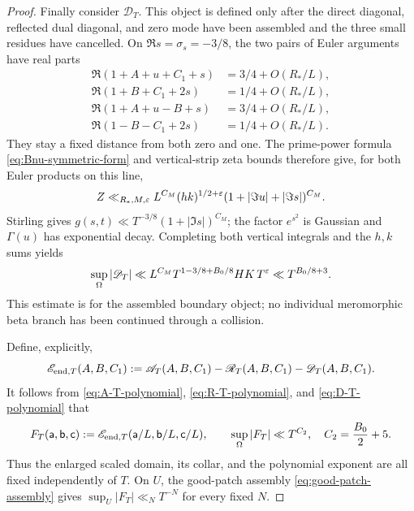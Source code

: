 \begin{proof}
Finally consider $\mathscr D_T$.  This object is defined only after the
direct diagonal, reflected dual diagonal, and zero mode have been assembled
and the three small residues have cancelled.  On
$\Re s=\sigma_s=-3/8$, the two pairs of Euler arguments have real parts
\begin{equation}\label{eq:D-T-Euler-lines}
 \begin{aligned}
 \Re(1+A+u+C_1+s)&=3/4+O(R_*/L),\\
 \Re(1+B+C_1+2s)&=1/4+O(R_*/L),\\
 \Re(1+A+u-B+s)&=3/4+O(R_*/L),\\
 \Re(1-B-C_1+2s)&=1/4+O(R_*/L).
 \end{aligned}
\end{equation}
They stay a fixed distance from both zero and one.  The prime-power formula
\eqref{eq:Bnu-symmetric-form} and vertical-strip zeta bounds therefore give, for both
Euler products on this line,
\begin{equation}\label{eq:D-T-Z-bound}
 Z\ll_{R_*,M,\varepsilon}L^{C_M}(hk)^{1/2+\varepsilon}
 (1+|\Im u|+|\Im s|)^{C_M}.
\end{equation}
Stirling gives
$g(s,t)\ll T^{-3/8}(1+|\Im s|)^{C_M}$; the factor $e^{s^2}$ is Gaussian
and $\Gamma(u)$ has exponential decay.  Completing both vertical integrals
and the $h,k$ sums yields
\begin{equation}\label{eq:D-T-polynomial}
 \sup_\Omega|\mathscr D_T|
 \ll L^{C_M}T^{1-3/8+B_0/8}HK\,T^\varepsilon
 \ll T^{B_0/8+3}.
\end{equation}
This estimate is for the assembled boundary object; no individual
meromorphic beta branch has been continued through a collision.

Define, explicitly,
\begin{equation}\label{eq:Eend-definition}
 \mathscr E_{\mathrm{end},T}(A,B,C_1)
 :=\mathscr A_T(A,B,C_1)-\mathscr R_T(A,B,C_1)
   -\mathscr D_T(A,B,C_1).
\end{equation}
It follows from \eqref{eq:A-T-polynomial}, \eqref{eq:R-T-polynomial}, and
\eqref{eq:D-T-polynomial} that
\begin{equation}\label{eq:end-error-polynomial}
 F_T(\mathsf a,\mathsf b,\mathsf c)
 :=\mathscr E_{\mathrm{end},T}(\mathsf a/L,\mathsf b/L,\mathsf c/L),
 \qquad
 \sup_\Omega|F_T|\ll T^{C_2},
 \quad C_2=\frac{B_0}{2}+5.
\end{equation}
Thus the enlarged scaled domain, its collar, and the polynomial exponent are
all fixed independently of $T$.  On $U$, the good-patch assembly
\eqref{eq:good-patch-assembly} gives
$\sup_U|F_T|\ll_NT^{-N}$ for every fixed $N$.


\end{proof}
